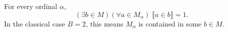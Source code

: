 For every ordinal $\alpha$,
$$(\exists b \in M)(\forall a \in M_{\alpha}) \; \llbracket a \in b \rrbracket = 1.$$
In the classical case $B = 2$, this means $M_{\alpha}$ is contained in some $b \in M$.
